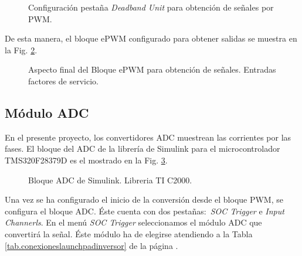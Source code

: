 \documentclass{report}
\begin{document}
\begin{figure}[!h]
    \begin{center}
    \caption{Configuración pestaña \textit{Deadband Unit} para obtención de señales por PWM.}
    \label{fig.configuracionpwm5} 
    \end{center}
\end{figure}

De esta manera, el bloque ePWM configurado para obtener salidas se muestra en la Fig. \ref{fig.pwmab}.

\begin{figure}[!h]
    \begin{center}
    \caption{Aspecto final del Bloque ePWM para obtención de señales. Entradas factores de servicio.}
    \label{fig.pwmab} 
    \end{center}
\end{figure}
\clearpage
\subsection{Módulo ADC} \label{sec.moduloadc}

En el presente proyecto, los convertidores ADC muestrean las corrientes por las fases.
El bloque del ADC de la librería de Simulink para el microcontrolador TMS320F28379D es el mostrado en la Fig. \ref{fig.configuracionadc}.

\begin{figure}[!h]
    \begin{center}
    \caption{Bloque ADC de Simulink. Libreria TI C2000.}
    \label{fig.configuracionadc} 
    \end{center}
\end{figure}

Una vez se ha configurado el inicio de la conversión desde el bloque PWM, se configura el bloque ADC. Éste cuenta con dos pestañas: \textit{SOC Trigger} e \textit{Input Channerls}.
En el menú \textit{SOC Trigger} seleccionamos el módulo ADC que convertirá la señal. Éste módulo ha de elegirse atendiendo a la Tabla \ref{tab.conexioneslaunchpadinversor} de la página \pageref{tab.conexioneslaunchpadinversor}. 
\end{document}
